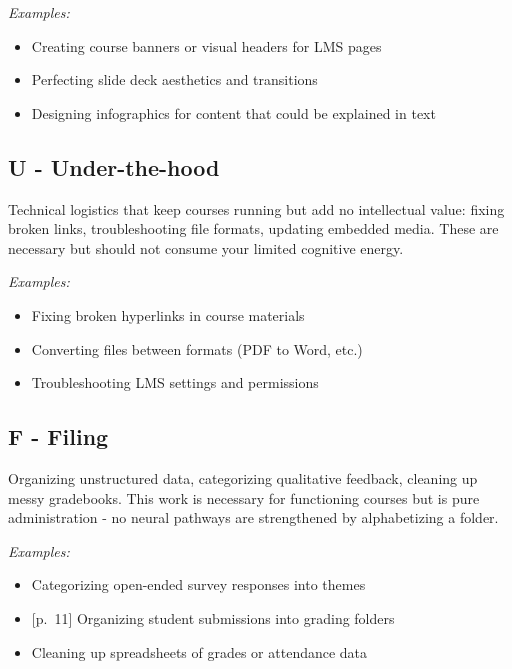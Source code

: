 \documentclass[
  letterpaper,
  DIV=11,
  numbers=noendperiod]{scrreprt}
\providecommand{\tightlist}{%
  \setlength{\itemsep}{0pt}\setlength{\parskip}{0pt}}
\begin{document}
\emph{Examples:}

\begin{itemize}
\tightlist
\item
  Creating course banners or visual headers for LMS pages
\item
  Perfecting slide deck aesthetics and transitions
\item
  Designing infographics for content that could be explained in text
\end{itemize}

\subsection{U - Under-the-hood}\label{u---under-the-hood}

Technical logistics that keep courses running but add no intellectual
value: fixing broken links, troubleshooting file formats, updating
embedded media. These are necessary but should not consume your limited
cognitive energy.

\emph{Examples:}

\begin{itemize}
\tightlist
\item
  Fixing broken hyperlinks in course materials
\item
  Converting files between formats (PDF to Word, etc.)
\item
  Troubleshooting LMS settings and permissions
\end{itemize}

\subsection{F - Filing}\label{f---filing}

Organizing unstructured data, categorizing qualitative feedback,
cleaning up messy gradebooks. This work is necessary for functioning
courses but is pure administration - no neural pathways are strengthened
by alphabetizing a folder.

\emph{Examples:}

\begin{itemize}
\tightlist
\item
  Categorizing open-ended survey responses into themes
\item
  {[}p.~11{]} Organizing student submissions into grading folders
\item
  Cleaning up spreadsheets of grades or attendance data
\end{itemize}
\end{document}
